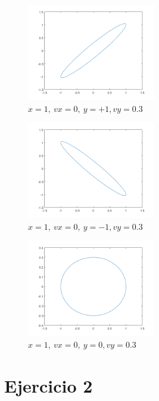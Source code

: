 \documentclass{article}
\begin{document}
\begin{figure}[H]
\centering
    \includegraphics[width=0.5\textwidth]{images/01c.png}
    \caption{$x = 1,~vx = 0,~y = +1, vy = 0.3$}
\end{figure}

\begin{figure}[H]
\centering
    \includegraphics[width=0.5\textwidth]{images/01D.png}
    \caption{$x = 1,~vx = 0,~y = -1, vy = 0.3$}
\end{figure}

\begin{figure}[H]
\centering
    \includegraphics[width=0.5\textwidth]{images/01E.png}
    \caption{$x = 1,~vx = 0,~y = 0, vy = 0.3$}
\end{figure}

\section{Ejercicio 2}
\end{document}
